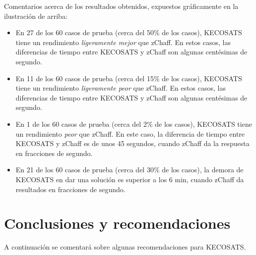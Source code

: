 \documentclass[12pt,lettersize,oneside]{article}
\begin{document}
Comentarios acerca de los resultados obtenidos, expuestos gráficamente en la
ilustración de arriba:\vspace{-2.5mm}
\begin{itemize}
\item En 27 de los 60 casos de prueba (cerca del 50\% de los casos), KECOSATS
  tiene un rendimiento \emph{ligeramente mejor} que zChaff. En estos casos, las
  diferencias de tiempo entre KECOSATS y zChaff son algunas centésimas de
  segundo.
\item En 11 de los 60 casos de prueba (cerca del 15\% de los casos), KECOSATS
  tiene un rendimiento \emph{ligeramente peor} que zChaff. En estos casos, las
  diferencias de tiempo entre KECOSATS y zChaff son algunas centésimas de
  segundo.
\item En 1 de los 60 casos de prueba (cerca del 2\% de los casos), KECOSATS
  tiene un rendimiento \emph{peor} que zChaff. En este caso, la diferencia de
  tiempo entre KECOSATS y zChaff es de unos 45 segundos, cuando zChaff da la
  respuesta en fracciones de segundo.
\item En 21 de los 60 casos de prueba (cerca del 30\% de los casos), la demora
  de KECOSATS en dar una solución es superior a los 6 min, cuando zChaff da
  resultados en fracciones de segundo.
\end{itemize}

\section{Conclusiones y recomendaciones}

A continuación se comentará sobre algunas recomendaciones para KECOSATS.
\end{document}
